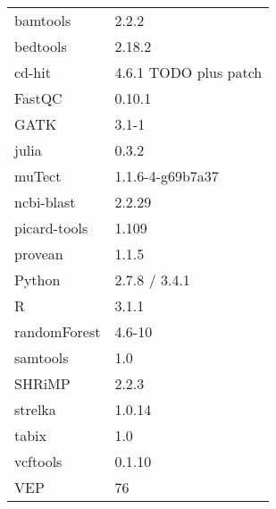 \documentclass[a4paper]{report}
\begin{document}
\begin{tabular}{ll}
\toprule
  bamtools                    & 2.2.2 \\
  bedtools                    & 2.18.2 \\
  cd-hit                      & 4.6.1 TODO plus patch \\
  FastQC                      & 0.10.1 \\
  GATK                        & 3.1-1 \\
  julia                       & 0.3.2 \\
  muTect                      & 1.1.6-4-g69b7a37 \\
  ncbi-blast                  & 2.2.29 \\
  picard-tools                & 1.109 \\
  provean                     & 1.1.5 \\
  Python                      & 2.7.8 / 3.4.1 \\
  R                           & 3.1.1 \\
  \quad randomForest          & 4.6-10 \\
  samtools                    & 1.0 \\
  SHRiMP                      & 2.2.3 \\
  strelka                     & 1.0.14 \\
  tabix                       & 1.0 \\
  vcftools                    & 0.1.10 \\
  VEP                         & 76 \\
\bottomrule
\end{tabular}









\end{document}
